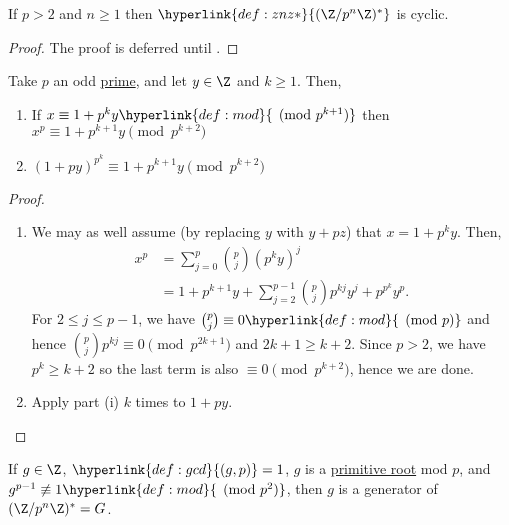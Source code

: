 \documentclass{article}
\begin{document}
\begin{nthm}\label{thm:2.9}
    If $p > 2$ and $n \geq 1$ then $\hyperlink{def:znz*}{(\Z/p^n \Z)^*}$ is cyclic.
\end{nthm}

\begin{proof}
    The proof is deferred until .
\end{proof}

\begin{nlemma}\label{lem:2.10}
    Take $p$ an odd \hyperlink{def:prime}{prime}, and let $y \in \Z$ and $k \geq 1$. Then,
    \begin{enumerate}[label=(\roman*)]
        \item If $x \equiv 1 + p^k y \hyperlink{def:mod}{\pmod{p^{k+1}}}$ then $x^p \equiv 1 + p^{k+1} y \pmod{p^{k+2}}$
        \item $(1 + p y)^{p^k} \equiv 1 + p^{k+1} y \pmod{p^{k+2}}$
    \end{enumerate}
\end{nlemma}

\begin{proof}
    \leavevmode
    \begin{enumerate}[label=(\roman*)]
        \item We may as well assume (by replacing $y$ with $y + pz$) that $x = 1 + p^k y$. Then,
            \begin{align*}
                x^p &= \sum_{j=0}^p \binom{p}{j} (p^k y)^j \\
                    &= 1 + p^{k+1} y + \sum_{j=2}^{p-1} \binom{p}{j} p^{kj} y^j + p^{p^k} y^p.
            \end{align*}
            For $2 \leq j \leq p-1$, we have $\binom{p}{j} \equiv 0 \hyperlink{def:mod}{\pmod{p}}$ and hence $\binom{p}{j} p^{kj} \equiv 0 \pmod{p^{2k+1}}$ and $2k+1 \geq k+2$.
            Since $p > 2$, we have $p^k \geq k+2$ so the last term is also $\equiv 0 \pmod{p^{k+2}}$, hence we are done.

        \item Apply part (i) $k$ times to $1 + py$. \qedhere
    \end{enumerate}
\end{proof}

\begin{nlemma}\label{lem:2.11}
    If $g \in \Z$, $\hyperlink{def:gcd}{(g, p)} = 1$, $g$ is a \hyperlink{def:primRoot}{primitive root} mod $p$, and $g^{p-1} \not\equiv 1 \hyperlink{def:mod}{\pmod{p^2}}$, then $g$ is a generator of $(\Z/p^n \Z)^* = G$.
\end{nlemma}
\end{document}
